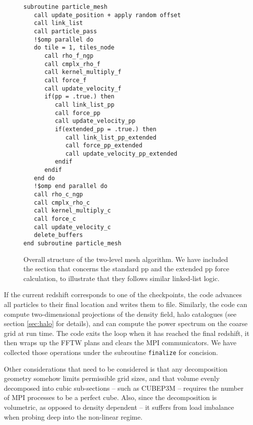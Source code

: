 \begin{figure}
\begin{verbatim}
subroutine particle_mesh
   call update_position + apply random offset
   call link_list
   call particle_pass
   !$omp parallel do
   do tile = 1, tiles_node
      call rho_f_ngp
      call cmplx_rho_f
      call kernel_multiply_f
      call force_f
      call update_velocity_f
      if(pp = .true.) then       
         call link_list_pp
         call force_pp
         call update_velocity_pp
         if(extended_pp = .true.) then
            call link_list_pp_extended
            call force_pp_extended
            call update_velocity_pp_extended       
         endif
      endif
   end do
   !$omp end parallel do
   call rho_c_ngp
   call cmplx_rho_c
   call kernel_multiply_c
   call force_c
   call update_velocity_c      
   delete_buffers
end subroutine particle_mesh
\end{verbatim}
\caption{Overall structure of the two-level mesh algorithm. We have included the section that concerns the standard pp and the extended pp force calculation, to illustrate that they follows similar linked-list logic. }
\label{fig:particle_mesh}
\end{figure}


If the current redshift corresponds to one of the checkpoints, the code advances all particles to their final location
and writes them to file. Similarly, the code can compute two-dimensional projections of the density field, halo catalogues (see section \ref{sec:halo} for details), and can compute the power spectrum on the coarse grid at run time. 
The code exits the loop when it has reached the final redshift, it then wraps up the {\small FFTW} plans 
and clears the {\small MPI} communicators. We have collected those operations under the subroutine {\tt finalize} for concision.

Other considerations that need to be considered is that any decomposition geometry somehow 
limits permissible grid sizes, and that volume evenly decomposed into cubic sub-sections 
--  such as {\small CUBEP3M} -- requires the number of {\small MPI} processes to be a perfect cube.
Also,  since the decomposition is volumetric, as opposed to density dependent -- 
it suffers from load imbalance when probing deep into the non-linear regime.
